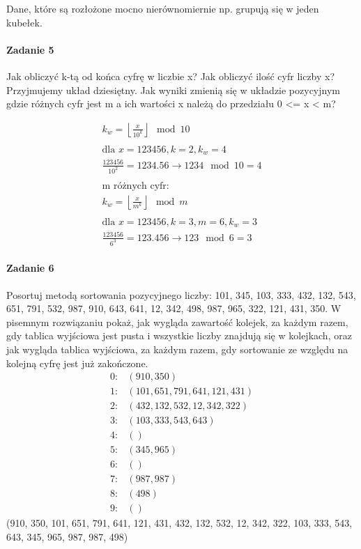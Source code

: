 \documentclass[18pt]{extarticle}
\begin{document}
Dane, które są rozłożone mocno nierównomiernie np. grupują się w jeden kubełek.

\paragraph{Zadanie 5} Jak obliczyć k-tą od końca cyfrę w liczbie x? Jak obliczyć ilość cyfr liczby x? Przyjmujemy układ dziesiętny. Jak wyniki zmienią się w układzie pozycyjnym gdzie różnych cyfr jest m a ich wartości x należą do przedziału 0 <= x < m?


\begin{gather*}
    k_w = \left \lfloor \frac{x}{10^k} \right \rfloor \mod 10 \\ \\
    \text{dla }x = 123456, k = 2, k_w = 4 \\ 
    \frac{123456}{10^2} = 1234.56 \rightarrow 1234 \mod 10 = 4 \\ \\
    \text{m różnych cyfr:} \\
    k_w = \left \lfloor \frac{x}{m^k} \right \rfloor \mod m \\ \\
    \text{dla }x = 123456, k = 3, m = 6, k_w = 3 \\
    \frac{123456}{6^3} = 123.456 \rightarrow 123 \mod 6 = 3
\end{gather*}

\pagebreak
\paragraph{Zadanie 6} Posortuj metodą sortowania pozycyjnego liczby: 101, 345, 103, 333, 432, 132, 543, 651, 791, 532, 987, 910, 643, 641, 12, 342, 498, 987, 965, 322, 121, 431, 350. W pisemnym rozwiązaniu pokaż, jak wygląda zawartość kolejek, za każdym razem, gdy tablica wyjściowa jest pusta i wszystkie liczby znajdują się w kolejkach, oraz jak wygląda tablica wyjściowa, za każdym razem, gdy sortowanie ze względu na kolejną cyfrę jest już zakończone.
\begin{align*}
    0: & \left(910, 350\right) \\
    1: & \left(101, 651, 791, 641, 121, 431\right) \\
    2: & \left(432, 132, 532, 12, 342, 322\right) \\
    3: & \left(103, 333, 543, 643\right) \\
    4: & \left(\right) \\
    5: & \left(345, 965\right) \\
    6: & \left(\right) \\
    7: & \left(987, 987\right) \\
    8: & \left(498\right) \\
    9: & \left(\right)
\end{align*}
(910, 350, 101, 651, 791, 641, 121, 431, 432, 132, 532, 12, 342, 322, 103, 333, 543, 643, 345, 965, 987, 987, 498)
\end{document}
